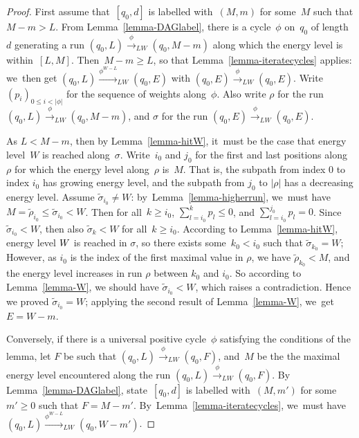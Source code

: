 \begin{proof}
First assume that~$[q_0,d]$ is labelled with~$(M,m)$ for some~$M$ such
that $M-m>L$. From Lemma~\ref{lemma-DAGlabel}, there is a cycle~$\phi$
on~$q_0$ of length~$d$ generating a run $(q_0,L)\xrightarrow{\phi}_{LW}(q_0,M-m)$
along which the energy level is within~$[L,M]$.  Then~$M-m\geq L$, so
that Lemma~\ref{lemma-iteratecycles} applies: we~then get $(q_0,L)
\xrightarrow{\phi^{W-L}}_{LW} (q_0,E)$ with $(q_0,E)\xrightarrow{\phi}_{LW}(q_0,E)$.
Write $(p_i)_{0\leq i<|\phi|}$ for the sequence of weights along~$\phi$.
Also write $\rho$ for the run $(q_0,L)\xrightarrow{\phi}_{LW}(q_0,M-m)$, and
$\sigma$ for the run $(q_0,E)\xrightarrow{\phi}_{LW}(q_0,E)$.

As $L<M-m$, then by Lemma~\ref{lemma-hitW}, it~must be the case that energy level~$W$ is
reached along~$\sigma$.  Write~$i_0$ and $j_0$ for the first and last
positions along~$\rho$ for which the energy level along~$\rho$ is~$M$.
That is, the subpath from index $0$ to index $i_0$ has growing energy level, and the subpath from $j_0$ to $|\rho|$ has a decreasing energy level. 
Assume $\tilde\sigma_{i_0}\not=W$: by~Lemma~\ref{lemma-higherrun},
we~must have $M=\tilde\rho_{i_0}\leq \tilde\sigma_{i_0}<W$.  Then for
all~$k\geq i_0$, $\sum_{l=i_0}^k p_l\leq 0$, and $\sum_{l=i_0}^{j_0}
p_l= 0$. Since $\tilde\sigma_{i_0}<W$, then also $\tilde\sigma_{k}<W$
for all~$k\geq i_0$. According to Lemma~\ref{lemma-hitW}, energy level $W$ is reached in $\sigma$, so 
there exists some~$k_0<i_0$ such that $\tilde\sigma_{k_0}=W$;
However, as $i_0$ is the index of the first maximal value in $\rho$, we have $\tilde\rho_{k_0}<M$, and the energy level increases in run $\rho$ between $k_0$ and $i_0$. So according to Lemma~\ref{lemma-W}, we should have $\tilde\sigma_{i_0}<W$, which raises a contradiction.
Hence we proved $\tilde\sigma_{i_0}=W$; applying
the second result of Lemma~\ref{lemma-W}, we~get $E=W-m$.

\medskip
Conversely, if there is a universal positive cycle~$\phi$ satisfying the
conditions of the lemma, let $F$ be such that $(q_0,L)\xrightarrow{\phi}_{LW}
(q_0,F)$, and~$M$ be the the maximal energy level encountered along
the run $(q_0,L)\xrightarrow{\phi}_{LW} (q_0,F)$. By
Lemma~\ref{lemma-DAGlabel}, state~$[q_0,d]$ is labelled with~$(M,m')$
for some~$m'\geq 0$ such that $F=M-m'$.
By~Lemma~\ref{lemma-iteratecycles}, we~must have $(q_0,L)
\xrightarrow{\phi^{W-L}}_{LW} (q_0,W-m')$.
\end{proof}


